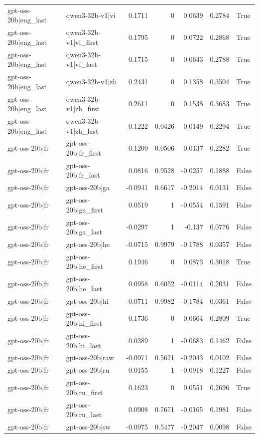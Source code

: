 \begin{table}
\begin{tabular}{l l r r r r l}
gpt-oss-20b|eng_last & qwen3-32b-v1|vi & 0.1711 & 0 & 0.0639 & 0.2784 & True \\
gpt-oss-20b|eng_last & qwen3-32b-v1|vi_first & 0.1795 & 0 & 0.0722 & 0.2868 & True \\
gpt-oss-20b|eng_last & qwen3-32b-v1|vi_last & 0.1715 & 0 & 0.0643 & 0.2788 & True \\
gpt-oss-20b|eng_last & qwen3-32b-v1|zh & 0.2431 & 0 & 0.1358 & 0.3504 & True \\
gpt-oss-20b|eng_last & qwen3-32b-v1|zh_first & 0.2611 & 0 & 0.1538 & 0.3683 & True \\
gpt-oss-20b|eng_last & qwen3-32b-v1|zh_last & 0.1222 & 0.0426 & 0.0149 & 0.2294 & True \\
gpt-oss-20b|fr & gpt-oss-20b|fr_first & 0.1209 & 0.0506 & 0.0137 & 0.2282 & True \\
gpt-oss-20b|fr & gpt-oss-20b|fr_last & 0.0816 & 0.9528 & -0.0257 & 0.1888 & False \\
gpt-oss-20b|fr & gpt-oss-20b|ga & -0.0941 & 0.6617 & -0.2014 & 0.0131 & False \\
gpt-oss-20b|fr & gpt-oss-20b|ga_first & 0.0519 & 1 & -0.0554 & 0.1591 & False \\
gpt-oss-20b|fr & gpt-oss-20b|ga_last & -0.0297 & 1 & -0.137 & 0.0776 & False \\
gpt-oss-20b|fr & gpt-oss-20b|he & -0.0715 & 0.9979 & -0.1788 & 0.0357 & False \\
gpt-oss-20b|fr & gpt-oss-20b|he_first & 0.1946 & 0 & 0.0873 & 0.3018 & True \\
gpt-oss-20b|fr & gpt-oss-20b|he_last & 0.0958 & 0.6052 & -0.0114 & 0.2031 & False \\
gpt-oss-20b|fr & gpt-oss-20b|hi & -0.0711 & 0.9982 & -0.1784 & 0.0361 & False \\
gpt-oss-20b|fr & gpt-oss-20b|hi_first & 0.1736 & 0 & 0.0664 & 0.2809 & True \\
gpt-oss-20b|fr & gpt-oss-20b|hi_last & 0.0389 & 1 & -0.0683 & 0.1462 & False \\
gpt-oss-20b|fr & gpt-oss-20b|raw & -0.0971 & 0.5621 & -0.2043 & 0.0102 & False \\
gpt-oss-20b|fr & gpt-oss-20b|ru & 0.0155 & 1 & -0.0918 & 0.1227 & False \\
gpt-oss-20b|fr & gpt-oss-20b|ru_first & 0.1623 & 0 & 0.0551 & 0.2696 & True \\
gpt-oss-20b|fr & gpt-oss-20b|ru_last & 0.0908 & 0.7671 & -0.0165 & 0.1981 & False \\
gpt-oss-20b|fr & gpt-oss-20b|sw & -0.0975 & 0.5477 & -0.2047 & 0.0098 & False \\

\end{tabular}
\end{table}
